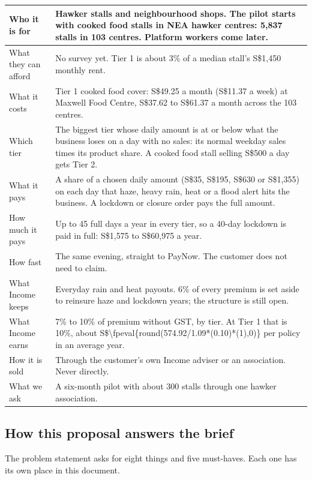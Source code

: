 \documentclass[11pt,a4paper]{article}
\newcommand{\sgd}{\textup{S\$}}
\def\bizPremium{574.92}
\newcommand{\biz}[2]{\sgd\num[group-separator={,},group-minimum-digits=4]{\fpeval{round(\bizPremium/1.09*(#1)*(#2),0)}}}
\begin{document}
{\small
\begin{xltabular}{\textwidth}{|K{3.6cm}|Y|}
\hline
Who it is for & Hawker stalls and neighbourhood shops. The pilot starts with cooked food stalls in NEA hawker centres: 5,837 stalls in 103 centres.\cite{nea-hawker} Platform workers come later. \\
\hline
What they can afford & No survey yet. Tier 1 is about 3\% of a median stall's \sgd 1,450 monthly rent.\cite{mse-rent} \\
\hline
What it costs & Tier 1 cooked food cover: \sgd 49.25 a month (\sgd 11.37 a week) at Maxwell Food Centre, \sgd 37.62 to \sgd 61.37 a month across the 103 centres. \\
\hline
Which tier & The biggest tier whose daily amount is at or below what the business loses on a day with no sales: its normal weekday sales times its product share. A cooked food stall selling \sgd 500 a day gets Tier 2. \\
\hline
What it pays & A share of a chosen daily amount (\sgd 35, \sgd 195, \sgd 630 or \sgd 1,355) on each day that haze, heavy rain, heat or a flood alert hits the business. A lockdown or closure order pays the full amount. \\
\hline
How much it pays & Up to 45 full days a year in every tier, so a 40-day lockdown is paid in full: \sgd 1,575 to \sgd 60,975 a year. \\
\hline
How fast & The same evening, straight to PayNow. The customer does not need to claim. \\
\hline
What Income keeps & Everyday rain and heat payouts. 6\% of every premium is set aside to reinsure haze and lockdown years; the structure is still open. \\
\hline
What Income earns & 7\% to 10\% of premium without GST, by tier. At Tier 1 that is 10\%, about \biz{0.10}{1} per policy in an average year. \\
\hline
How it is sold & Through the customer's own Income adviser or an association. Never directly. \\
\hline
What we ask & A six-month pilot with about 300 stalls through one hawker association. \\
\hline
\end{xltabular}}

\subsection*{How this proposal answers the brief}

The problem statement asks for eight things and five must-haves.\cite{ps} Each one has its own place in this document.
\end{document}
